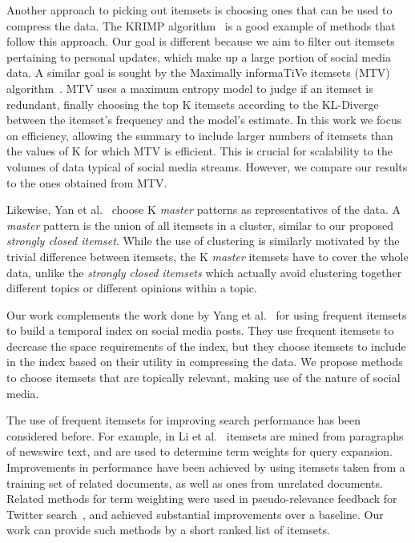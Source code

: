 \documentclass{sig-alternate}
\begin{document}
Another approach to picking out itemsets is choosing ones that 
can be used to compress the data. The KRIMP algorithm~\cite{vreeken2011krimp} is 
a good example of methods that follow this approach. Our goal is different because
we aim to filter out itemsets pertaining to personal updates, which make up a large
portion of social media data. 
A similar goal is sought by the Maximally informaTiVe itemsets (MTV) algorithm~\cite{mampaey2011tell}. 
MTV uses a maximum entropy model to judge if an itemset is redundant, finally choosing the
top K itemsets according to the KL-Diverge between the itemset's  frequency and  the model's estimate. 
In this work we focus on efficiency, allowing the summary to include larger numbers
of itemsets than the values of K for which MTV is efficient.
This is crucial for scalability to the volumes of data typical of social media streams.
However, we compare our results to the ones obtained from MTV.

Likewise, Yan et al.~\cite{yan2005summarizing} choose 
K \emph{master} patterns as representatives of the data. 
A \emph{master} pattern is the union of all itemsets in a 
cluster, similar to our proposed \emph{strongly closed itemset}. 
While the use of clustering is similarly motivated by 
the trivial difference between itemsets, 
the K \emph{master} itemsets  have to cover the whole data, 
unlike the \emph{strongly closed itemsets} which actually 
avoid clustering together different topics or different opinions within a topic.

Our work complements the work done by Yang et al.~\cite{yang2012framework} for using 
frequent itemsets to build a temporal index on social media posts. 
They use frequent itemsets to decrease the space requirements of the index,  
but they choose itemsets to include in the index based on their utility in compressing the data. 
We propose methods to choose itemsets that are topically relevant, 
making use of the nature of social media.


The use of frequent itemsets for improving search performance has been considered before. 
For example, in Li et al.~\cite{li2010mining} itemsets are mined from
paragraphs of newswire text, and are used to determine term weights for query
expansion.
Improvements in performance have been achieved by using itemsets taken from
a training set of related documents, as well as ones from unrelated documents.
Related methods for term weighting were
used in pseudo-relevance feedback for Twitter search~\cite{abounlaga2012frequent,laumicroblog},
and achieved substantial improvements over a baseline.
Our work can provide such methods by a short ranked list of itemsets.
\end{document}
